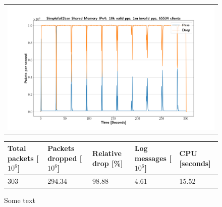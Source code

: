 \begin{figure}[p]
	\label{fig:simplefail2ban:shm:ip4:1m}
	\centering
	\scriptsize
	\begin{tabular}{c}
    	\centerline{\includegraphics[width=1.2\textwidth]{images/simplefail2ban_shm_ipv4_v10k_iv1m_c65534.png}}
	\end{tabular}
	\begin{tabular}{lllll}
		\toprule
		\textbf{Total packets [$10^6$]} & \textbf{Packets dropped [$10^6$]} & \textbf{Relative drop [\%]} & \textbf{Log messages [$10^6$]} & \textbf{CPU [seconds]} \\ \midrule 
		303 & 294.34 & 98.88 & 4.61 & 15.52 \\
		\bottomrule
	\end{tabular}
	\caption[Simplefail2ban Shared Memory IPv4 1m PPS]{Some text}
\end{figure}


